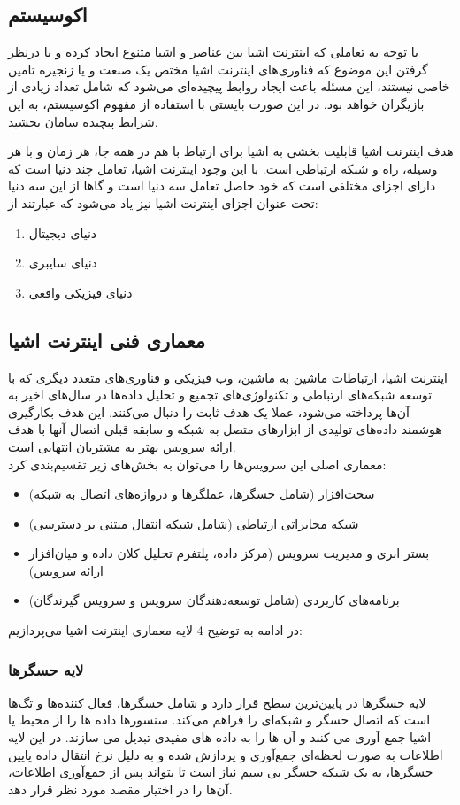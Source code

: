 \subsection{اکوسیستم}
با توجه به تعاملی که اینترنت اشیا بین عناصر و اشیا متنوع ایجاد کرده و با درنظر گرفتن این موضوع که فناوری‌های اینترنت اشیا مختص یک صنعت و یا زنجیره تامین خاصی نیستند، این مسئله باعث ایجاد روابط پیچیده‌ای می‌شود که شامل تعداد زیادی از بازیگران خواهد بود. در این صورت بایستی با استفاده از مفهوم اکوسیستم، به این شرایط پیچیده سامان بخشید.


هدف اینترنت اشیا قابلیت‌ بخشی به اشیا برای ارتباط با هم در همه جا، هر زمان و با هر وسیله، راه و شبكه‌ ارتباطی است. با این وجود اینترنت اشیا، تعامل چند دنیا است که دارای اجزای مختلفی است که خود حاصل تعامل سه دنیا است و گاها از این سه دنیا تحت عنوان اجزای اینترنت اشیا نیز یاد می‌شود که عبارتند از:
\begin{enumerate}
	\item دنیای دیجیتال
	\item دنیای سایبری
	\item دنیای فیزیکی واقعی
\end{enumerate}
\subsection{معماری فنی اینترنت اشیا}
اینترنت اشیا، ارتباطات ماشین به ماشین، وب فیزیكی و فناوری‌های متعدد دیگری که با توسعه شبكه‌های ارتباطی و تكنولوژی‌های تجمیع و تحلیل داده‌ها در سال‌های اخیر به آن‌ها پرداخته می‌شود، عملا یک هدف ثابت را دنبال می‌کنند. این هدف بكارگیری هوشمند داده‌های تولیدی از ابزارهای متصل به شبكه و سابقه قبلی اتصال آنها با هدف ارائه سرویس بهتر به مشتریان انتهایی است.\\
 معماری اصلی این سرویس‌ها را می‌توان به بخش‌های زیر تقسیم‌بندی کرد:
\begin{itemize}
	\item سخت‌افزار (شامل حسگرها، عملگرها و دروازه‌های اتصال به شبکه)
	\item شبکه مخابراتی ارتباطی (شامل شبکه انتقال مبتنی بر دسترسی)
	\item بستر ابری و مدیریت سرویس (مرکز داده، پلتفرم تحلیل کلان داده و میان‌افزار ارائه سرویس)
	\item برنامه‌های کاربردی (شامل توسعه‌دهندگان سرویس و سرویس گیرندگان)
\end{itemize}
در ادامه به توضیح 4 لایه معماری اینترنت اشیا می‌پردازیم:
\subsubsection{لایه حسگرها}
لایه حسگرها در پایین‌ترین سطح قرار دارد و شامل حسگرها، فعال کننده‌ها و تگ‌ها است که اتصال حسگر و شبکه‌ای را فراهم می‌کند. سنسورها داده ها را از محیط یا اشیا جمع آوری می کنند و آن ها را به داده های مفیدی تبدیل می سازند. در این لایه اطلاعات به صورت لحظه‌ای جمع‌آوری و پردازش شده و به دلیل نرخ انتقال داده پایین حسگرها، به یک شبکه حسگر بی سیم نیاز است تا بتواند پس از جمع‌آوری اطلاعات، آن‌ها را در اختیار مقصد مورد نظر قرار دهد.

